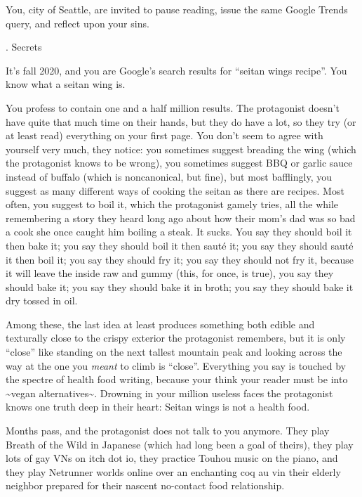 \documentclass[12pt]{article}
\newcommand\chapter[2]{{\thispagestyle{empty} \Large \sc #1. \quad #2

\vspace{1.5em}}}
\begin{document}
You, city of Seattle, are invited to pause reading, issue the same Google Trends query, and reflect upon your sins.

\newpage \thispagestyle{empty}

\chapter{2}{Secrets}

It's fall 2020, and you are Google's search results for ``seitan wings recipe''.
You know what a seitan wing is.

You profess to contain one and a half million results.
The protagonist doesn't have quite that much time on their hands,
but they do have a lot, so they try (or at least read) everything on your first page.
You don't seem to agree with yourself very much, they notice:
you sometimes suggest breading the wing (which the protagonist knows to be wrong),
you sometimes suggest BBQ or garlic sauce instead of buffalo (which is noncanonical, but fine),
but most bafflingly, you suggest as many different ways of cooking the seitan as there are recipes.
Most often, you suggest to boil it,
which the protagonist gamely tries,
all the while remembering a story they heard long ago about how their mom's dad was so bad a cook she once caught him boiling a steak.
It sucks.
You say they should boil it then bake it;
you say they should boil it then saut\'e it;
you say they should saut\'e it then boil it;
you say they should fry it;
you say they should not fry it, because it will leave the inside raw and gummy (this, for once, is true),
you say they should bake it;
you say they should bake it in broth;
you say they should bake it dry tossed in oil.

Among these, the last idea at least produces something both edible and texturally close to the crispy exterior the protagonist remembers, but it is only ``close'' like standing on the next tallest mountain peak and looking across the way at the one you {\em meant} to climb is ``close''.
Everything you say is touched by the spectre of health food writing,
because your think your reader must be into \textasciitilde{}vegan alternatives\textasciitilde{}.
Drowning in your million useless faces the protagonist knows one truth deep in their heart: Seitan wings is not a health food.

Months pass, and the protagonist does not talk to you anymore.
They play Breath of the Wild in Japanese (which had long been a goal of theirs),
they play lots of gay VNs on itch dot io,
they practice Touhou music on the piano,
and they play Netrunner worlds online over an enchanting coq au vin their elderly neighbor prepared for their nascent no-contact food relationship.
\end{document}
